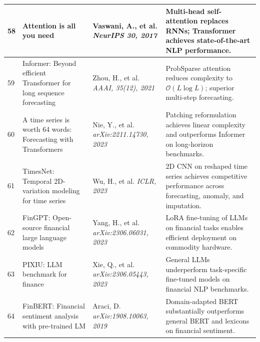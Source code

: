 \documentclass[12pt,a4paper,oneside]{report}
\theoremstyle{definition}
\theoremstyle{remark}
\begin{document}
\begin{center}
\begin{longtable}{|p{0.8cm}|p{4.2cm}|>{\raggedright\arraybackslash}p{4cm}|p{4.5cm}|}
58 & Attention is all you need \cite{Vaswani2017Attention} & Vaswani, A., et al. \newline\newline \textit{NeurIPS 30, 2017} & Multi-head self-attention replaces RNNs; Transformer achieves state-of-the-art NLP performance. \\ \hline

59 & Informer: Beyond efficient Transformer for long sequence forecasting \cite{Zhou2021Informer} & Zhou, H., et al. \newline\newline \textit{AAAI, 35(12), 2021} & ProbSparse attention reduces complexity to $\mathcal{O}(L \log L)$; superior multi-step forecasting. \\ \hline

60 & A time series is worth 64 words: Forecasting with Transformers \cite{Nie2023PatchTST} & Nie, Y., et al. \newline\newline \textit{arXiv:2211.14730, 2023} & Patching reformulation achieves linear complexity and outperforms Informer on long-horizon benchmarks. \\ \hline

61 & TimesNet: Temporal 2D-variation modeling for time series \cite{Wu2023TimesNet} & Wu, H., et al. \newline\newline \textit{ICLR, 2023} & 2D CNN on reshaped time series achieves competitive performance across forecasting, anomaly, and imputation. \\ \hline

62 & FinGPT: Open-source financial large language models \cite{Yang2023FinGPT} & Yang, H., et al. \newline\newline \textit{arXiv:2306.06031, 2023} & LoRA fine-tuning of LLMs on financial tasks enables efficient deployment on commodity hardware. \\ \hline

63 & PIXIU: LLM benchmark for finance \cite{Xie2023PIXIU} & Xie, Q., et al. \newline\newline \textit{arXiv:2306.05443, 2023} & General LLMs underperform task-specific fine-tuned models on financial NLP benchmarks. \\ \hline

64 & FinBERT: Financial sentiment analysis with pre-trained LM \cite{Araci2019FinBERT} & Araci, D. \newline\newline \textit{arXiv:1908.10063, 2019} & Domain-adapted BERT substantially outperforms general BERT and lexicons on financial sentiment. \\ \hline


\end{longtable}
\end{center}
\end{document}
